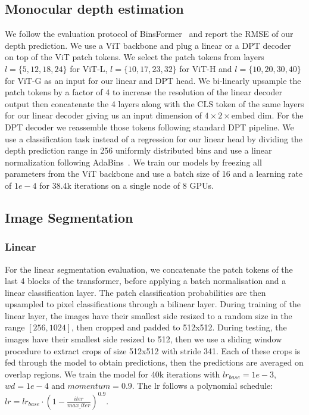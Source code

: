 \subsection{Monocular depth estimation}
We follow the evaluation protocol of BinsFormer~\cite{li2022binsformer} and report the RMSE of our depth prediction.
We use a ViT backbone and plug a linear or a DPT decoder~\cite{ranftl2021vision} on top of the ViT patch tokens. We select the patch tokens from layers $l=\{5, 12, 18, 24\}$ for ViT-L, $l=\{10, 17, 23, 32\}$ for ViT-H and $l=\{10, 20, 30, 40\}$ for ViT-G as an input for our linear and DPT head. We bi-linearly upsample the patch tokens by a factor of 4 to increase the resolution of the linear decoder output then concatenate the 4 layers along with the CLS token of the same layers for our linear decoder giving us an input dimension of $4 \times 2 \times \text{embed dim}$. For the DPT decoder we reassemble those tokens following standard DPT pipeline.
We use a classification task instead of a regression for our linear head by dividing the depth prediction range in 256 uniformly distributed bins and use a linear normalization following AdaBins~\cite{bhat2019adabins}.
We train our models by freezing all parameters from the ViT backbone and use a batch size of 16 and a learning rate of $1e-4$ for 38.4k iterations on a single node of 8 GPUs.



\subsection{Image Segmentation}
\subsubsection{Linear}
For the linear segmentation evaluation, we concatenate the patch tokens of the last 4 blocks of the transformer, before applying a batch normalisation and a linear classification layer. The patch classification probabilities are then upsampled to pixel classifications through a bilinear layer. During training of the linear layer, the images have their smallest side resized to a random size in the range $[256,1024]$, then cropped and padded to 512x512. During testing, the images have their smallest side resized to 512, then we use a sliding window procedure to extract crops of size 512x512 with stride 341. Each of these crops is fed through the model to obtain predictions, then the predictions are averaged on overlap regions. We train the model for 40k iterations with $lr_{base}=1e-3$, $wd=1e-4$ and $momentum=0.9$. The lr follows a polynomial schedule: $lr=lr_{base} \cdot (1-\frac{iter}{max\_iter})^{0.9}$.


